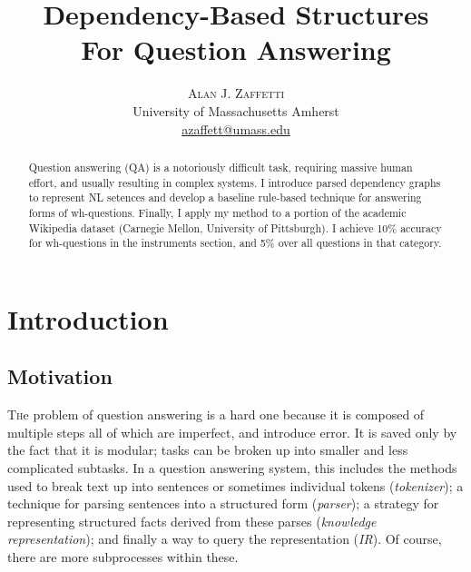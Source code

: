 \documentclass[twoside]{article}
\title{\vspace{-5mm}\fontsize{18pt}{12pt}\selectfont\textbf{Dependency-Based Structures\\For Question Answering}} %
\author{
\large
\textsc{Alan J. Zaffetti}\\[2mm]%
\normalsize University of Massachusetts Amherst \\ %
\normalsize \href{mailto:azaffett@umass.edu}{azaffett@umass.edu} %
}
\date{}
\begin{document}
\maketitle %

\thispagestyle{fancy} %


\begin{abstract}

\noindent Question answering (QA) is a notoriously difficult task, requiring massive human effort, and usually resulting in complex systems.  I introduce parsed dependency graphs to represent NL setences and develop a baseline rule-based technique for answering forms of wh-questions.  Finally, I apply my method to a portion of the academic Wikipedia dataset (Carnegie Mellon, University of Pittsburgh).  I achieve 10\% accuracy for wh-questions in the instruments section, and 5\% over all questions in that category. 

\end{abstract}


\section{Introduction}

\subsection{Motivation}

\lettrine[nindent=0em,lines=3]{T}he problem of question answering is a hard one because it is composed of multiple steps all of which are imperfect, and introduce error.  It is saved only by the fact that it is modular; tasks can be broken up into smaller and less complicated subtasks.  In a question answering system, this includes the methods used to break text up into sentences or sometimes individual tokens (\textit{tokenizer}); a technique for parsing sentences into a structured form (\textit{parser}); a strategy for representing structured facts derived from these parses (\textit{knowledge representation}); and finally a way to query the representation (\textit{IR}). Of course, there are more subprocesses within these.
\end{document}
